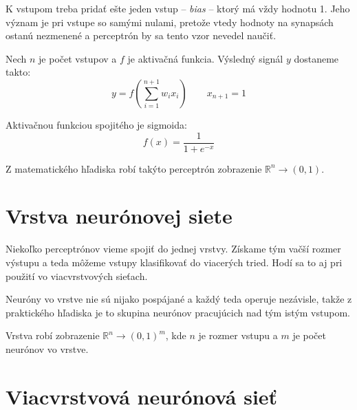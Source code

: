 K vstupom treba pridať ešte jeden vstup -- \textit{bias} -- ktorý má vždy hodnotu 1. Jeho význam je pri vstupe so samými nulami, pretože vtedy hodnoty na synapsách ostanú nezmenené a perceptrón by sa tento vzor nevedel naučiť.

Nech $n$ je počet vstupov a  $f$ je aktivačná funkcia. Výsledný signál $y$ dostaneme takto:
$$y= f\left(\sum_{i=1}^{n+1} w_i x_i \right)\qquad x_{n+1}=1$$

Aktivačnou funkciou spojitého je sigmoida: 
$$f(x) = \frac{1}{1+e^{-x}}$$

Z matematického hľadiska robí takýto perceptrón zobrazenie $\mathbb{R}^n\rightarrow (0,1)$.

\section{Vrstva neurónovej siete}

Niekoľko perceptrónov vieme spojiť do jednej vrstvy. Získame tým vačší rozmer výstupu a teda môžeme vstupy klasifikovať do viacerých tried. Hodí sa to aj pri použití vo viacvrstvových sieťach.

Neuróny vo vrstve nie sú nijako pospájané a každý teda operuje nezávisle, takže z praktického hľadiska je to skupina neurónov pracujúcich nad tým istým vstupom.

Vrstva robí zobrazenie $\mathbb{R}^n\rightarrow (0,1)^m$, kde $n$ je rozmer vstupu a $m$ je počet neurónov vo vrstve.

\section{Viacvrstvová neurónová sieť}
